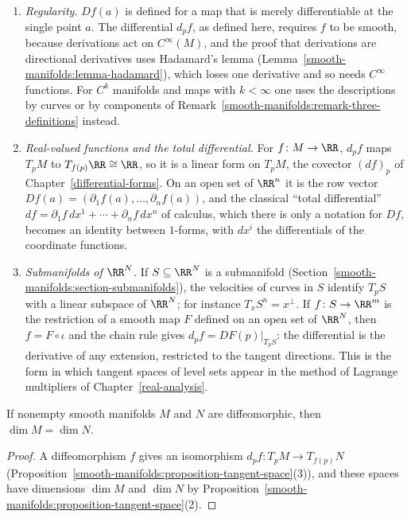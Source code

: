 \begin{remark}
\begin{enumerate}
\item \emph{Regularity.} $Df(a)$ is defined for a map that is merely differentiable at the single point $a$. The differential $d_pf$, as defined here, requires $f$ to be smooth, because derivations act on $C^\infty(M)$, and
the proof that derivations are directional derivatives uses Hadamard's lemma (Lemma~\ref{smooth-manifolds:lemma-hadamard}), which loses one derivative and so needs $C^\infty$ functions. For $C^k$ manifolds and maps with
$k < \infty$ one uses the descriptions by curves or by components of Remark~\ref{smooth-manifolds:remark-three-definitions} instead.
\item \emph{Real-valued functions and the total differential.} For $f \colon M \to \RR$, $d_pf$ maps $T_pM$ to $T_{f(p)}\RR \cong \RR$, so it is a linear form on $T_pM$, the covector $(df)_p$ of Chapter~\ref{differential-forms}. On
an open set of $\RR^n$ it is the row vector $Df(a) = (\partial_1f(a), \ldots, \partial_nf(a))$, and the classical ``total differential'' $df = \partial_1f\,dx^1 + \cdots + \partial_nf\,dx^n$ of calculus, which there is only a
notation for $Df$, becomes an identity between $1$-forms, with $dx^i$ the differentials of the coordinate functions.
\item \emph{Submanifolds of $\RR^N$.} If $S \subseteq \RR^N$ is a submanifold (Section~\ref{smooth-manifolds:section-submanifolds}), the velocities of curves in $S$ identify $T_pS$ with a linear subspace of $\RR^N$; for instance
$T_xS^n = x^\perp$. If $f \colon S \to \RR^m$ is the restriction of a smooth map $F$ defined on an open set of $\RR^N$, then $f = F \circ \iota$ and the chain rule gives $d_pf = DF(p)|_{T_pS}$: the differential is the
derivative of any extension, restricted to the tangent directions. This is the form in which tangent spaces of level sets appear in the method of Lagrange multipliers of Chapter~\ref{real-analysis}.
\end{enumerate}
\end{remark}

\begin{corollary}\label{smooth-manifolds:corollary-invariance-dimension}
If nonempty smooth manifolds $M$ and $N$ are diffeomorphic, then $\dim M = \dim N$.
\end{corollary}

\begin{proof}
A diffeomorphism $f$ gives an isomorphism $d_pf \colon T_pM \to T_{f(p)}N$ (Proposition~\ref{smooth-manifolds:proposition-tangent-space}(3)), and these spaces
have dimensions $\dim M$ and $\dim N$ by Proposition~\ref{smooth-manifolds:proposition-tangent-space}(2).
\end{proof}

